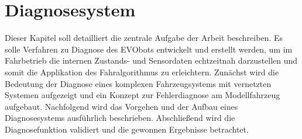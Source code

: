 \begin{comment}
TODO:
--> Bildquellen überprüfen
--> Referenzen zu Bilder, Tabellen und Quellen im Text prüfen
--> Einarbeitungleitfaden ergänzen: neuer Knoten anlegen, Directory builden usw aus Fabis Anleitung
--> Einarbeitungleitfaden ergänzen: Midnight Commander
--> Bild und Text zu Diagnose-Panel ergänzen

--> Kapitel zur Fernsteuerung des EVObots: zuerst via VNC Client Desktop gespiegelt, um mobil ohne Bildschirm und Maus/Tastatur auf Gerät arbeiten zu können. Später hat sich aber gezeigt, dass Grafikberechnung und Übertragung des Desktops zu viel Rechenleistung benötigt, wodurch Rechenleistung von ROS reduziert wird, demnach kamen Algorithmen zum Spurhalten dem realen Verhalten nicht hinterher, deshalb Zeitverzug und keine Spurregelung möglich! Umstieg auf SSH zugriff via Terminal auf PC, grafische Benutzeroberfläche auf Ubuntu deaktiviert, um sämtliche Ressourcen für ROS zu generieren. Ergebnis zeigt echtzeitgetreue Spurerfassung und Regelung!

CAN-to-WiFi Gateway mit PaspberryPi oder Ardiuno möglich

Mehr Zustandsüberwachungssystem als Diagnosesystem 

Off-Board-Kommunikation als Diagnose in ISO Schicht 7 geregelt 

Generierung von Diagnosedaten ist von Beginn der Entwicklung an essentiell, um spätere Komplexität zu beherrschen. 

Fehler sind üblich in komplexen Systemen. Sollten vermieden werden, kommen aber unter bestimmten Bedingungen und Voraussetzungen vor. Abhängig von Implementierung, Fehlervermeidung usw. Fale-Safe-Zustand. Fehlerzustand, Fehlerwirkung
Wie äußert sich Fehler oder Fehlfunktion? --> unplausibler Signalwert, falscher Wert oder out of range

Abweichung zum SOLL ist nicht unbedingt programmseitiger Fehler, sondern kann aus Logikfunktion des Programmierers folgen. 
\end{comment}



\chapter{Diagnosesystem} \label{cha:Diagnosesystem}

Dieser Kapitel soll detailliert die zentrale Aufgabe der Arbeit beschreiben. Es solle Verfahren zu Diagnose des EVObots entwickelt und erstellt werden, um im Fahrbetrieb die internen Zustands- und Sensordaten echtzeitnah darzustellen und somit die Applikation des Fahralgorithmus zu erleichtern. 
Zunächst wird die Bedeutung der Diagnose eines komplexen Fahrzeugsystems mit vernetzten Systemen aufgezeigt und ein Konzept zur Fehlerdiagnose am Modellfahrzeug aufgebaut. Nachfolgend wird das Vorgehen und der Aufbau eines Diagnosesystems ausführlich beschrieben. Abschließend wird die Diagnosefunktion validiert und die gewonnen Ergebnisse betrachtet. 

